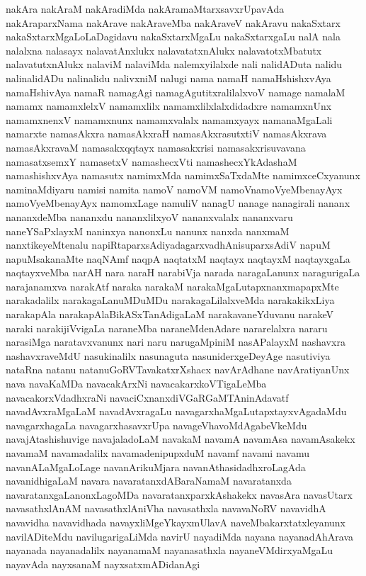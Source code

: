 {nakAra
nakAraM
nakAradiMda
nakAramaMtarxsavxrUpavAda
nakAraparxNama
nakArave
nakAraveMba
nakAraveV
nakAravu
nakaSxtarx
nakaSxtarxMgaLoLaDagidavu
nakaSxtarxMgaLu
nakaSxtarxgaLu
nalA
nala
nalalxna
nalasayx
nalavatAnxlukx
nalavatatxnAlukx
nalavatotxMbatutx
nalavatutxnAlukx
nalaviM
nalaviMda
nalemxyilalxde
nali
nalidADuta
nalidu
nalinalidADu
nalinalidu
nalivxniM
nalugi
nama
namaH
namaHshishxvAya
namaHshivAya
namaR
namagAgi
namagAgutitxralilalxvoV
namage
namalaM
namamx
namamxlelxV
namamxlilx
namamxlilxlalxdidadxre
namamxnUnx
namamxnenxV
namamxnunx
namamxvalalx
namamxyayx
namanaMgaLali
namarxte
namasAkxra
namasAkxraH
namasAkxrasutxtiV
namasAkxrava
namasAkxravaM
namasakxqqtayx
namasakxrisi
namasakxrisuvavana
namasatxsemxY
namasetxV
namashecxVti
namashecxYkAdashaM
namashishxvAya
namasutx
namimxMda
namimxSaTxdaMte
namimxceCxyanunx
naminaMdiyaru
namisi
namita
namoV
namoVM
namoVnamoVyeMbenayAyx
namoVyeMbenayAyx
namomxLage
namuliV
nanagU
nanage
nanagirali
nananx
nananxdeMba
nananxdu
nananxlilxyoV
nananxvalalx
nananxvaru
naneYSaPxlayxM
naninxya
nanonxLu
nanunx
nanxda
nanxmaM
nanxtikeyeMtenalu
napiRtaparxsAdiyadagarxvadhAnisuparxsAdiV
napuM
napuMsakanaMte
naqNAmf
naqpA
naqtatxM
naqtayx
naqtayxM
naqtayxgaLa
naqtayxveMba
narAH
nara
naraH
narabiVja
narada
naragaLanunx
naragurigaLa
narajanamxva
narakAtf
naraka
narakaM
narakaMgaLutapxnanxmapapxMte
narakadalilx
narakagaLanuMDuMDu
narakagaLilalxveMda
narakakikxLiya
narakapAla
narakapAlaBikASxTanAdigaLaM
narakavaneYduvanu
narakeV
naraki
narakijiVvigaLa
naraneMba
naraneMdenAdare
nararelalxra
nararu
narasiMga
naratavxvanunx
nari
naru
narugaMpiniM
nasAPalayxM
nashavxra
nashavxraveMdU
nasukinalilx
nasunaguta
nasuniderxgeDeyAge
nasutiviya
nataRna
natanu
natanuGoRVTavakatxrXshacx
navArAdhane
navAratiyanUnx
nava
navaKaMDa
navacakArxNi
navacakarxkoVTigaLeMba
navacakorxVdadhxraNi
navaciCxnanxdiVGaRGaMTAninAdavatf
navadAvxraMgaLaM
navadAvxragaLu
navagarxhaMgaLutapxtayxvAgadaMdu
navagarxhagaLa
navagarxhasavxrUpa
navageVhavoMdAgabeVkeMdu
navajAtashishuvige
navajaladoLaM
navakaM
navamA
navamAsa
navamAsakekx
navamaM
navamadalilx
navamadenipupxduM
navamf
navami
navamu
navanALaMgaLoLage
navanArikuMjara
navanAthasidadhxroLagAda
navanidhigaLaM
navara
navaratanxdABaraNamaM
navaratanxda
navaratanxgaLanonxLagoMDa
navaratanxparxkAshakekx
navasAra
navasUtarx
navasathxlAnAM
navasathxlAniVha
navasathxla
navavaNoRV
navavidhA
navavidha
navavidhada
navayxliMgeYkayxmUlavA
naveMbakarxtatxleyanunx
navilADiteMdu
navilugarigaLiMda
navirU
nayadiMda
nayana
nayanadAhArava
nayanada
nayanadalilx
nayanamaM
nayanasathxla
nayaneVMdirxyaMgaLu
nayavAda
nayxsanaM
nayxsatxmADidanAgi
}
